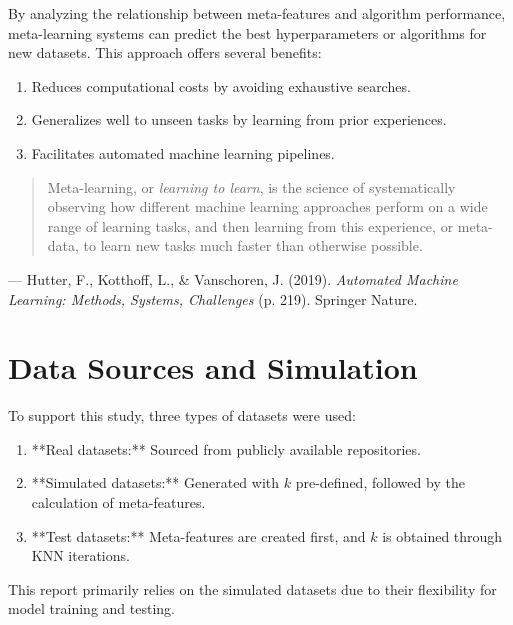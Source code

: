 \documentclass[a4paper,11pt]{article}
\begin{document}
By analyzing the relationship between meta-features and algorithm performance, meta-learning systems can predict the best hyperparameters or algorithms for new datasets. This approach offers several benefits:
\begin{enumerate}
    \item Reduces computational costs by avoiding exhaustive searches.
    \item Generalizes well to unseen tasks by learning from prior experiences.
    \item Facilitates automated machine learning pipelines.
\end{enumerate}
\begin{quote}
    Meta-learning, or \emph{learning to learn}, is the science of systematically observing how different machine learning approaches perform on a wide range of learning tasks, and then learning from this experience, or meta-data, to learn new tasks much faster than otherwise possible.
    \end{quote}
    
    \begin{flushright}
    — Hutter, F., Kotthoff, L., \& Vanschoren, J. (2019). \emph{Automated Machine Learning: Methods, Systems, Challenges} (p. 219). Springer Nature.
    \end{flushright}
\section{Data Sources and Simulation}
To support this study, three types of datasets were used:
\begin{enumerate}
    \item **Real datasets:** Sourced from publicly available repositories.
    \item **Simulated datasets:** Generated with \(k\) pre-defined, followed by the calculation of meta-features.
    \item **Test datasets:** Meta-features are created first, and \(k\) is obtained through KNN iterations.
\end{enumerate}

This report primarily relies on the simulated datasets due to their flexibility for model training and testing.
\end{document}
